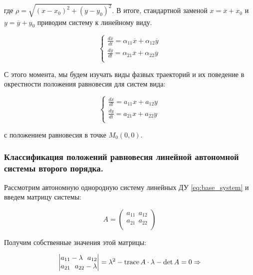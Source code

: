 \documentclass[a4paper, 12pt]{article}
\begin{document}
    где $\rho = \sqrt{(x - x_0)^2 + (y - y_0)^2}$. В итоге, стандартной заменой $x = \overline{x} + x_0$ и $y = \overline{y} + y_0$ приводим систему к линейному виду.

    \begin{equation}
      \begin{cases}
        \frac{d \overline{x}}{d t} = \alpha_{11} \overline{x} + \alpha_{12} \overline{y} \\
        \frac{d \overline{y}}{d t} = \alpha_{21} \overline{x} + \alpha_{22} \overline{y} \\        
      \end{cases}
    \end{equation}

    С этого момента, мы будем изучать виды фазвых траекторий и их поведение в окрестности положения равновесия для систем вида:

    \begin{equation} \label{eq:base_system}
      \begin{cases}
        \frac{d x}{d t} = a_{11} x + a_{12} y \\
        \frac{d y}{d t} = a_{21} x + a_{22} y \\        
      \end{cases}
    \end{equation}

    с положением равновесия в точке $M_0(0, 0)$.

    \subsubsection{Классификация положений равновесия линейной автономной системы второго порядка.}

    Рассмотрим автономную однородную систему линейных ДУ \eqref{eq:base_system} и введем матрицу системы:
    
    \begin{equation}
      A = 
      \begin{pmatrix}
        a_{11} ~~ a_{12} \\
        a_{21} ~~ a_{22} \\
      \end{pmatrix}
    \end{equation}

    Получим собственные значения этой матрицы:

    \begin{equation}
      \begin{vmatrix}
        a_{11} - \lambda ~~ a_{12} \\
        a_{21} ~~ a_{22} - \lambda \\
      \end{vmatrix} = 
      \lambda^2 - \operatorname{trace} A \cdot \lambda - \det A = 0 \Rightarrow
    \end{equation}
\end{document}
